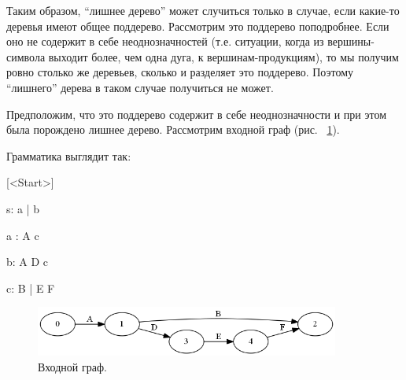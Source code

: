 Таким образом, “лишнее дерево” может случиться только в случае, если какие-то деревья имеют общее поддерево. Рассмотрим это поддерево поподробнее. Если оно не содержит в себе неоднозначностей (т.е. ситуации, когда из вершины-символа выходит более, чем одна дуга, к вершинам-продукциям), то мы получим ровно столько же деревьев, сколько и разделяет это поддерево. Поэтому “лишнего” дерева в таком случае получиться не может. 

Предположим, что это поддерево содержит в себе неоднозначности и при этом была порождено лишнее дерево. Рассмотрим входной граф (рис. ~\ref{sppf_proof_input}). 

Грамматика выглядит так:

[<Start>]

s: a | b

a : A c

b: A D c

c: B | E F

\begin{figure}[h]
\centering
\includegraphics[width=100mm]{Pictures/SPPF_proof_input.png}
\caption{Входной граф.}
\label{sppf_proof_input}
\end{figure}

